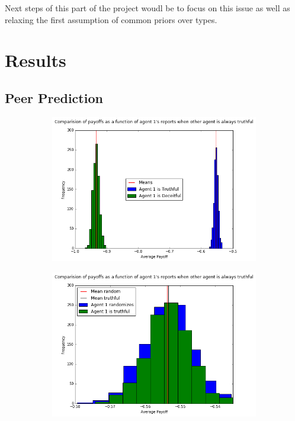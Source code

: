 \documentclass{scrartcl}
\begin{document}
Next steps of this part of the project woudl be to focus on this issue as well as relaxing the first assumption of common priors over types.
\section{Results}
\subsection{Peer Prediction}
\begin{figure}[H]
\caption{Computational verification of Property 1}
\begin{subfigure}{0.4\textwidth}
\includegraphics[scale=0.4]{pp_1}
\end{subfigure}
\hspace{0.1\textwidth}
\begin{subfigure}{0.4\textwidth}
\includegraphics[scale=0.4]{rand}
\end{subfigure}
\end{figure}
\end{document}
